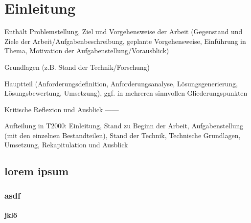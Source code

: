 
\chapter{Einleitung}
Enthält Problemstellung, Ziel und Vorgehensweise der Arbeit (Gegenstand und Ziele der Arbeit/Aufgabenbeschreibung,
geplante Vorgehensweise, Einführung in Thema, Motivation der Aufgabenstellung/Vorausblick)

Grundlagen (z.B. Stand der Technik/Forschung)

Hauptteil (Anforderungsdefinition, Anforderungsanalyse, Lösungsgenerierung, Lösungsbewertung, Umsetzung),
ggf. in mehreren sinnvollen Gliederungspunkten

Kritische Reflexion und Ausblick
------

Aufteilung in T2000: Einleitung, Stand zu Beginn der Arbeit, Aufgabenstellung (mit den einzelnen Bestandteilen), Stand der Technik, Technische Grundlagen, Umsetzung, Rekapitulation und Ausblick

\cites{appleDesignGuide, appleMfiProgram}

\section{lorem ipsum}

\subsection{asdf}
\subsubsection{jklö}